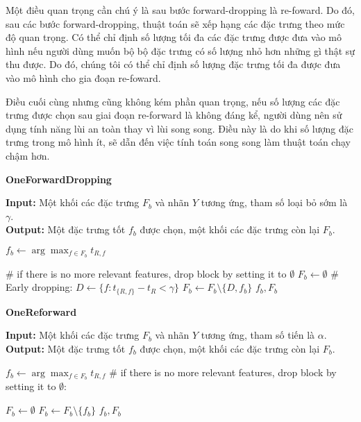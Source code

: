 Một điều quan trọng cần chú ý là sau bước forward-dropping là re-foward. Do đó, sau các bước forward-dropping, thuật toán sẽ xếp hạng các đặc trưng theo mức độ quan trọng. Có thể chỉ định số lượng tối đa các đặc trưng được đưa vào mô hình nếu người dùng muốn bộ bộ đặc trưng có số lượng nhỏ hơn những gì thật sự thu được. Do đó, chúng tôi có thể chỉ định số lượng đặc trưng tối đa được đưa vào mô hình cho gia đoạn re-foward.

Điều cuối cùng nhưng cũng không kém phần quan trọng, nếu số lượng các đặc trưng được chọn sau giai đoạn re-forward là không đáng kể, người dùng nên sử dụng tính năng lùi an toàn thay vì lùi song song. Điều này là do khi số lượng đặc trưng trong mô hình ít, sẽ dẫn đến việc tính toán song song làm thuật toán chạy chậm hơn.

\begin{breakablealgorithm}
	\caption{\textbf{OneForwardDropping} }\label{alg:ofd}
	\noindent\textbf{Input:} Một khối các đặc trưng $F_b$ và nhãn $Y$ tương ứng, tham số loại bỏ sớm là $\gamma$.\\
	\textbf{Output:} Một đặc trưng tốt $f_b$ được chọn, một khối các đặc trưng còn lại $F_b$.
	\begin{algorithmic}[1]
		\State $f_b \gets \arg\max_{f\in F_b}	t_{R,f}	$
		
		\State \# if there is no more relevant features, drop block by setting it to  $\emptyset$
		\State $F_b\gets \emptyset$
		\Else
		\State \# Early dropping:
		\State $D \gets \{f:t_{\{R,f\}}-t_R<\gamma  \}$
		\State $F_b \gets F_b\setminus \{D, f_b \} $
		\EndIf
		\State \Return $f_b,F_b$
	\end{algorithmic}
\end{breakablealgorithm}

\begin{breakablealgorithm}
	\caption{\textbf{OneReforward} }\label{alg:or}
	\noindent\textbf{Input:} Một khối các đặc trưng $F_b$ và nhãn $Y$ tương ứng, tham số tiến là $\alpha$.
	\textbf{Output:} Một đặc trưng tốt $f_b$ được chọn, một khối các đặc trưng còn lại $F_b$.
	\begin{algorithmic}[1]
		\State $f_b \gets \arg\max_{f\in F_b}	t_{R,f}	$
		\State \# if there is no more relevant features, drop block by setting it to  $\emptyset$:
		
		\State $F_b\gets \emptyset$
		\Else
		\State $F_b \leftarrow F_b\setminus\{f_b\}$
		\EndIf
		\State \Return $f_b,F_b$
	\end{algorithmic}
\end{breakablealgorithm}